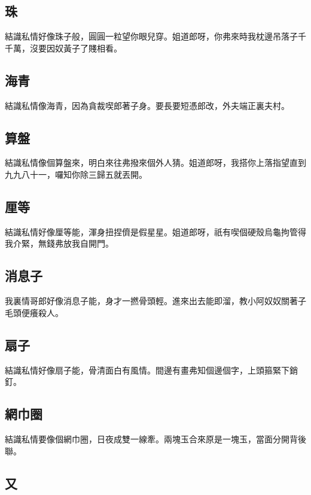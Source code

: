 \subsection*{珠}

結識私情好像珠子般，圓圓一粒望你眼兒穿。姐道郎呀，你弗來時我枕邊吊落子千千萬，沒要因奴黃子了賤相看。

\subsection*{海青}

結識私情像海青，因為貪裁喫郎著子身。要長要短憑郎改，外夫端正裏夫村。

\subsection*{算盤}

結識私情像個算盤來，明白來往弗撥來個外人猜。姐道郎呀，我搭你上落指望直到九九八十一，囉知你除三歸五就丟開。

\subsection*{厘等}

結識私情好像厘等能，渾身扭捏儕是假星星。姐道郎呀，祇有喫個硬殼烏龜拘管得我介緊，無錢弗放我自開門。

\subsection*{消息子}

我裏情哥郎好像消息子能，身才一撚骨頭輕。進來出去能即溜，教小阿奴奴關著子毛頭便癢殺人。

\subsection*{扇子}

結識私情好像扇子能，骨清面白有風情。間邊有畫弗知個邊個字，上頭箍緊下銷釘。

\subsection*{網巾圈}

結識私情要像個網巾圈，日夜成雙一線牽。兩塊玉合來原是一塊玉，當面分開背後聯。

\subsection*{又}

